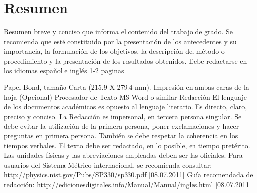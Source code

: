 \chapter{Resumen}

Resumen breve y conciso que informa el contenido
del trabajo de grado. Se recomienda que esté
constituido por la presentación de los antecedentes
y su importancia, la formulación de los objetivos, la
descripción del método o procedimiento y la
presentación de los resultados obtenidos.
Debe redactarse en los idiomas español e inglés
1-2 paginas







Papel
Bond, tamaño Carta (215.9 X 279.4 mm).
Impresión en ambas caras de la hoja (Opcional)
Procesador de Texto MS Word o similar
Redacción
El lenguaje de los documentos académicos es opuesto al lenguaje literario. Es
directo, claro, preciso y conciso. La Redacción es impersonal, en tercera persona
singular. Se debe evitar la utilización de la primera persona, poner exclamaciones y
hacer preguntas en primera persona. También se debe respetar la coherencia en los
tiempos verbales. El texto debe ser redactado, en lo posible, en tiempo pretérito.
Las unidades físicas y las abreviaciones empleadas deben ser las oficiales. Para
usuarios del Sistema Métrico internacional, se recomienda consultar:
http://physics.nist.gov/Pubs/SP330/sp330.pdf [08.07.2011]
Guía recomendada de redacción:
http://edicionesdigitales.info/Manual/Manual/ingles.html [08.07.2011]




